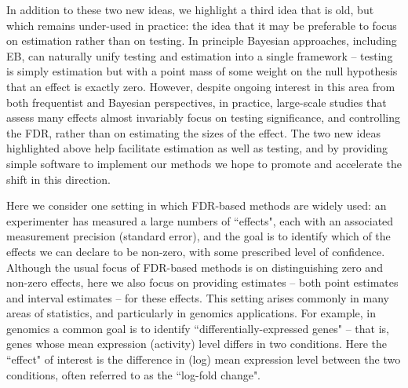 \documentclass[11pt]{article}
\begin{document}
In addition to these two new ideas, we highlight a third idea that is old, but which remains under-used in practice:
the idea that it may be preferable to focus on estimation rather than on testing.
In principle Bayesian approaches, including EB, can naturally unify testing and estimation into a single framework -- testing is
simply estimation but with a point mass of some weight on the null hypothesis that an effect is exactly zero.
However, despite ongoing interest in this area from both frequentist \cite{benjamini2005false} and Bayesian \cite{zhao2012empirical,gelman2012we} 
perspectives, in practice, large-scale studies that assess many effects almost invariably focus on testing significance, and
controlling the FDR, rather than on estimating the sizes of the effect. 
The two new ideas highlighted above 
help facilitate estimation as well as testing, and by providing simple software to implement our methods
we hope to promote and accelerate the shift in this direction. 

Here we consider one setting in which FDR-based methods are widely used:
an experimenter has measured a large numbers of ``effects", each with an associated
measurement precision (standard error), 
and the goal is to identify which of the effects we can declare to be non-zero, with some prescribed level of confidence.
Although the usual focus of FDR-based methods is on distinguishing zero and non-zero effects,
here we also focus on providing estimates -- both point estimates and interval estimates -- for these effects.
This setting arises commonly in many areas of statistics, and particularly in genomics applications.
For example, in genomics
a common goal is to identify ``differentially-expressed genes" -- that is, genes
whose mean expression (activity) level differs in two conditions. Here the ``effect" of interest is the difference in (log) 
mean expression level between the two conditions, often referred to as the ``log-fold change". 

%
\end{document}
